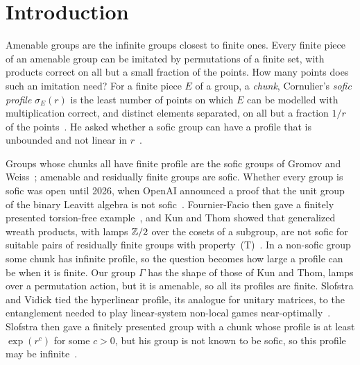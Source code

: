 \section{Introduction}\label{sec:intro}

Amenable groups are the infinite groups closest to finite ones. Every finite piece of an amenable group can be imitated by permutations of a
finite set, with products correct on all but a small fraction of the points. How many points does such an imitation need? For a finite piece
$E$ of a group, a \emph{chunk}, Cornulier's \emph{sofic profile} $\sigma_E(r)$ is the least number of points on which $E$ can be modelled with
multiplication correct, and distinct elements separated, on all but a fraction $1/r$ of the points~\cite{Cornulier2013}. He asked whether a
sofic group can have a profile that is unbounded and not linear in $r$~\cite[Problem~3.18]{Cornulier2013}.

Groups whose chunks all have finite profile are the sofic groups of Gromov and Weiss~\cite{Gromov1999,Weiss2000}; amenable and residually
finite groups are sofic. Whether every group is sofic was open until 2026, when OpenAI announced a proof that the unit group of the binary
Leavitt algebra is not sofic~\cite{OpenAI2026}. Fournier-Facio then gave a finitely presented torsion-free example~\cite{FournierFacio2026},
and Kun and Thom showed that generalized wreath products, with lamps $\mathbb Z/2$ over the cosets of a subgroup, are not sofic for suitable pairs of
residually finite groups with property~(T)~\cite{KunThom2026}. In a non-sofic group some chunk has infinite profile, so the question becomes how large a profile can be
when it is finite. Our group $\Gamma$ has the shape of those of Kun and Thom, lamps over a permutation action, but it is amenable, so all its
profiles are finite. Slofstra and Vidick tied the hyperlinear profile, its analogue for unitary matrices, to the entanglement needed to play
linear-system non-local games near-optimally~\cite{SlofstraVidick2018}. Slofstra then gave a finitely presented group with a chunk whose
profile is at least $\exp(r^{c})$ for some $c>0$, but his group is not known to be sofic, so this profile may be infinite~\cite{Slofstra2018}.

